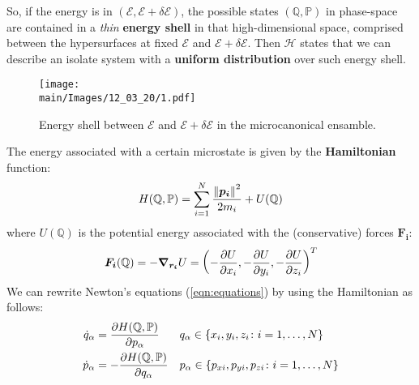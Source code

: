 \documentclass[../../main.tex]{subfiles}
\begin{document}
\medskip

So, if the energy is in $(\mathcal{E}, \mathcal{E}+ \delta \mathcal{E})$, the possible states $(\mathbb{Q},\mathbb{P})$ in phase-space are contained in a \textit{thin} \textbf{energy shell} in that high-dimensional space, comprised between the hypersurfaces at fixed $\mathcal{E}$ and $\mathcal{E}+ \delta \mathcal{E}$. Then $\mathcal{H}$ states that we can describe an isolate system with a \textbf{uniform distribution} over such energy shell. 

\begin{figure}[htp]
    \centering
    \texttt{[image: \\main/Images/12\_03\_20/1.pdf]}
    \caption{ Energy shell between $\mathcal{E}$ and $\mathcal{E}+\delta \mathcal{E}$ in the microcanonical ensamble\label{fig:energy-shell}.}
\end{figure}

\medskip

The energy associated with a certain microstate is given by the \textbf{Hamiltonian}  function:
\begin{align}\label{eqn:hamiltonian}
    H(\mathbb{Q},\mathbb{P}) = \sum_{i=1}^N \frac{\norm{\bm{p_i}}^2}{2m_i} + U(\mathbb{\mathbb{Q}}) 
\end{align}
where $U(\mathbb{Q})$ is the potential energy associated with the (conservative) forces $\bm{F_i}$:
\begin{align*}
    \bm{F_i}(\mathbb{Q}) = - \grad_{\bm{r_i}} U = \left(-\pdv{U}{x_i}, - \pdv{U}{y_i}, -\pdv{U}{z_i}\right)^T
\end{align*}
We can rewrite Newton's equations (\ref{eqn:equations}) by using the Hamiltonian as follows:
\begin{align*}
    \dot{q}_\alpha &=  \pdv{H(\mathbb{Q},\mathbb{P})}{p_\alpha} && q_\alpha \in \{x_i, y_i, z_i \colon i=1, \dots, N\}\\
    \dot{p}_\alpha &= -\pdv{H(\mathbb{Q},\mathbb{P})}{q_\alpha}
    && p_\alpha \in \{p_{xi}, p_{yi}, p_{zi} \colon i = 1, \dots, N\}
\end{align*}
\end{document}
